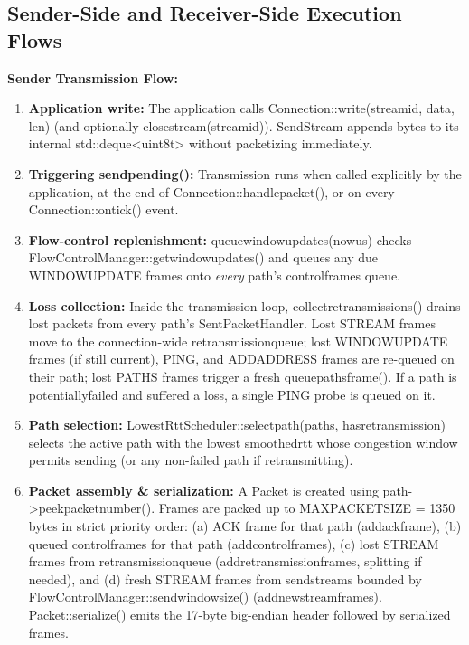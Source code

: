 \documentclass[10pt,a4paper]{article}
\newcommand{\codeul}{\textunderscore\hspace{0pt}}
\DeclareRobustCommand{\code}[1]{{\ttfamily\let\_\codeul #1}}
\begin{document}
\subsection{Sender-Side and Receiver-Side Execution Flows}
\textbf{Sender Transmission Flow:}
\begin{enumerate}
    \item \textbf{Application write:} The application calls \code{Connection::write(stream\_id, data, len)} (and optionally \code{close\_stream(stream\_id)}). \code{SendStream} appends bytes to its internal \code{std::deque<uint8\_t>} without packetizing immediately.
    \item \textbf{Triggering \code{send\_pending()}:} Transmission runs when called explicitly by the application, at the end of \code{Connection::handle\_packet()}, or on every \code{Connection::on\_tick()} event.
    \item \textbf{Flow-control replenishment:} \code{queue\_window\_updates(now\_us)} checks \code{FlowControlManager::get\_window\_updates()} and queues any due \code{WINDOW\_UPDATE} frames onto \emph{every} path's \code{control\_frames} queue.
    \item \textbf{Loss collection:} Inside the transmission loop, \code{collect\_retransmissions()} drains lost packets from every path's \code{SentPacketHandler}. Lost \code{STREAM} frames move to the connection-wide \code{retransmission\_queue}; lost \code{WINDOW\_UPDATE} frames (if still current), \code{PING}, and \code{ADD\_ADDRESS} frames are re-queued on their path; lost \code{PATHS} frames trigger a fresh \code{queue\_paths\_frame()}. If a path is \code{potentially\_failed} and suffered a loss, a single \code{PING} probe is queued on it.
    \item \textbf{Path selection:} \code{LowestRttScheduler::select\_path(paths, has\_retransmission)} selects the active path with the lowest \code{smoothed\_rtt} whose congestion window permits sending (or any non-failed path if retransmitting).
    \item \textbf{Packet assembly \& serialization:} A \code{Packet} is created using \code{path->peek\_packet\_number()}. Frames are packed up to \code{MAX\_PACKET\_SIZE = 1350} bytes in strict priority order: (a) \code{ACK} frame for that path (\code{add\_ack\_frame}), (b) queued \code{control\_frames} for that path (\code{add\_control\_frames}), (c) lost \code{STREAM} frames from \code{retransmission\_queue} (\code{add\_retransmission\_frames}, splitting if needed), and (d) fresh \code{STREAM} frames from \code{send\_streams} bounded by \code{FlowControlManager::send\_window\_size()} (\code{add\_new\_stream\_frames}). \code{Packet::serialize()} emits the 17-byte big-endian header followed by serialized frames.

\end{enumerate}
\end{document}

